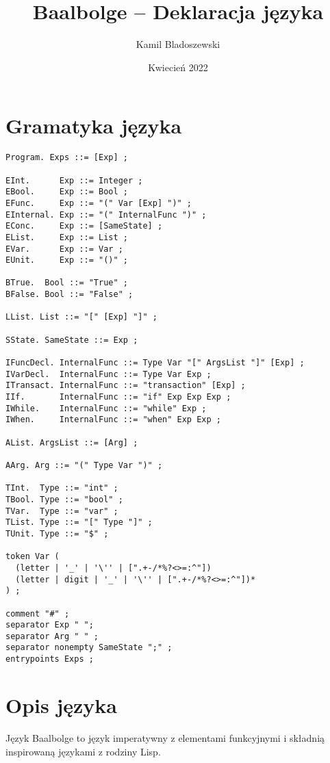 \documentclass{article}
\title{Baalbolge -- Deklaracja języka}
\author{Kamil Bladoszewski}
\date{Kwiecień 2022}
\begin{document}
\maketitle

\tableofcontents

\pagebreak

\section{Gramatyka języka}

\begin{lstlisting}
Program. Exps ::= [Exp] ;

EInt.      Exp ::= Integer ;
EBool.     Exp ::= Bool ;
EFunc.     Exp ::= "(" Var [Exp] ")" ;
EInternal. Exp ::= "(" InternalFunc ")" ;
EConc.     Exp ::= [SameState] ;
EList.     Exp ::= List ;
EVar.      Exp ::= Var ;
EUnit.     Exp ::= "()" ;

BTrue.  Bool ::= "True" ;
BFalse. Bool ::= "False" ;

LList. List ::= "[" [Exp] "]" ;

SState. SameState ::= Exp ;

IFuncDecl. InternalFunc ::= Type Var "[" ArgsList "]" [Exp] ;
IVarDecl.  InternalFunc ::= Type Var Exp ;
ITransact. InternalFunc ::= "transaction" [Exp] ;
IIf.       InternalFunc ::= "if" Exp Exp Exp ;
IWhile.    InternalFunc ::= "while" Exp ;
IWhen.     InternalFunc ::= "when" Exp Exp ;

AList. ArgsList ::= [Arg] ;

AArg. Arg ::= "(" Type Var ")" ;

TInt.  Type ::= "int" ;
TBool. Type ::= "bool" ;
TVar.  Type ::= "var" ;
TList. Type ::= "[" Type "]" ;
TUnit. Type ::= "$" ;

token Var (
  (letter | '_' | '\'' | [".+-/*%?<>=:^"])
  (letter | digit | '_' | '\'' | [".+-/*%?<>=:^"])*
) ;

comment "#" ;
separator Exp " ";
separator Arg " " ;
separator nonempty SameState ";" ;
entrypoints Exps ;

\end{lstlisting}

\pagebreak

\section{Opis języka}

Język Baalbolge to język imperatywny z elementami funkcyjnymi i składnią inspirowaną językami z rodziny Lisp.
\end{document}
